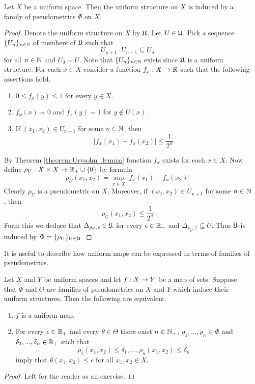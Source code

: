 \begin{theorem}\label{theorem:each_uniform_structure_is_induced_by_pseudometrics}
	Let $X$ be a uniform space. Then the uniform structure on $X$ is induced by a family of pseudometrics $\Phi$ on $X$.
\end{theorem}
\begin{proof}
	Denote the uniform structure on $X$ by ${\mathfrak U}$. Let $U \in {\mathfrak U}$. Pick a sequence $\{U_n\}_{n\in {\mathbb N}}$ of members of ${\mathfrak U}$ such that
	$$U_{n+1}\cdot U_{n+1} \subseteq U_n$$
	for all $n \in {\mathbb N}$ and $U_0 = U$. Note that $\{U_n\}_{n\in {\mathbb N}}$ exists since ${\mathfrak U}$ is a uniform structure. For each $x \in X$ consider a function $f_x:X\rightarrow {\mathbb R}$ such that the following assertions hold.
	\begin{enumerate}[label=\textbf{(\arabic*)}, leftmargin=3.0em]
		\item $0\leq f_x(y) \leq 1$ for every $y \in X$.
		\item $f_x(x) = 0$ and $f_x(y) = 1$ for $y \not \in U(x)$.
		\item If $(x_1,x_2) \in U_{n+1}$ for some $n \in {\mathbb N}$, then
		      $$|f_x(x_1) - f_x(x_2)| \leq \frac{1}{2^n}$$
	\end{enumerate}
	By Theorem \ref{theorem:Urysohn_lemma} function $f_x$ exists for each $x \in X$. Now define $\rho_U:X\times X\rightarrow {\mathbb R}_+\cup \{0\}$ by formula
	$$\rho_U(x_1,x_2) = \sup_{x\in X}|f_x(x_1) - f_x(x_2)|$$
	Clearly $\rho_U$ is a pseudometric on $X$. Moreover, if $(x_1,x_2) \in U_{n+1}$ for some $n \in {\mathbb N}$, then
	$$\rho_U(x_1,x_2) \leq \frac{1}{2^n}$$
	Form this we deduce that $\Delta_{\rho_U, \epsilon} \in {\mathfrak U}$ for every $\epsilon \in {\mathbb R}_+$ and $\Delta_{\rho_U, 1}\subseteq U$. Thus ${\mathfrak U}$ is induced by $\Phi = \{\rho_U\}_{U \in {\mathfrak U}}$.
\end{proof}
\noindent
It is useful to describe how uniform maps can be expressed in terms of families of pseudometrics.

\begin{fact}\label{fact:uniform_maps_in_terms_of_pseudometrics}
	Let $X$ and $Y$ be uniform spaces and let $f:X\rightarrow Y$ be a map of sets. Suppose that $\Phi$ and $\Theta$ are families of pseudometrics on $X$ and $Y$ which induce their uniform structures. Then the following are equivalent.
	\begin{enumerate}[label=\emph{\textbf{(\roman*)}}, leftmargin=3.0em]
		\item $f$ is a uniform map.
		\item For every $\epsilon \in {\mathbb R}_+$ and every $\theta \in \Theta$ there exist $n \in {\mathbb N}_+$, $\rho_1,...,\rho_n \in \Phi$ and $\delta_1,...,\delta_n \in {\mathbb R}_+$ such that
		      $$\rho_1(x_1,x_2) \leq \delta_1,...,\rho_n(x_1, x_2) \leq \delta_n$$
		      imply that $\theta(x_1,x_2) \leq \epsilon$ for all $x_1,x_2 \in X$.
	\end{enumerate}
\end{fact}
\begin{proof}
	Left for the reader as an exercise.
\end{proof}

